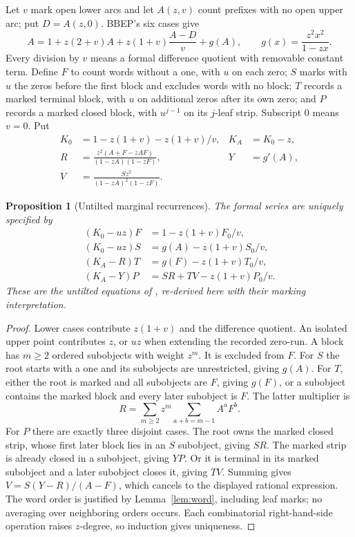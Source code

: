 \documentclass[11pt]{amsart}
\numberwithin{equation}{section}
\newtheorem{proposition}[theorem]{Proposition}
\theoremstyle{remark}\newtheorem{remark}[theorem]{Remark}
\begin{document}
Let $v$ mark open lower arcs and let $A(z,v)$ count prefixes with no open upper arc; put $D=A(z,0)$. BBEP's six cases give
\begin{equation}\label{eq:A}
 A=1+z(2+v)A+z(1+v)\frac{A-D}{v}+g(A),\qquad
 g(x)=\frac{z^2x^2}{1-zx}.
\end{equation}
Every division by $v$ means a formal difference quotient with removable constant term. Define $F$ to count words without a one, with $u$ on each zero; $S$ marks with $u$ the zeros before the first block and excludes words with no block; $T$ records a marked terminal block, with $u$ on additional zeros after its own zero; and $P$ records a marked closed block, with $u^{j-1}$ on its $j$-leaf strip. Subscript $0$ means $v=0$. Put
\begin{align*}
 K_0&=1-z(1+v)-z(1+v)/v,& K_A&=K_0-z,\\
 R&=\frac{z^2(A+F-zAF)}{(1-zA)(1-zF)},&Y&=g'(A),\\
 V&=\frac{Sz^2}{(1-zA)^2(1-zF)}.&&
\end{align*}
\begin{proposition}[Untilted marginal recurrences]\label{prop:M}
The formal series are uniquely specified by
\begin{align}\label{eq:M}
 (K_0-uz)F&=1-z(1+v)F_0/v,\nonumber\\
 (K_0-uz)S&=g(A)-z(1+v)S_0/v,\nonumber\\
 (K_A-R)T&=g(F)-z(1+v)T_0/v,\nonumber\\
 (K_A-Y)P&=SR+TV-z(1+v)P_0/v.
\end{align}
These are the untilted equations of \cite[Proposition 5.2, equations (18)--(21)]{N2}, re-derived here with their marking interpretation.
\end{proposition}
\begin{proof}
Lower cases contribute $z(1+v)$ and the difference quotient. An isolated upper point contributes $z$, or $uz$ when extending the recorded zero-run. A block has $m\geq2$ ordered subobjects with weight $z^m$. It is excluded from $F$. For $S$ the root starts with a one and its subobjects are unrestricted, giving $g(A)$. For $T$, either the root is marked and all subobjects are $F$, giving $g(F)$, or a subobject contains the marked block and every later subobject is $F$. The latter multiplier is
\[
 R=\sum_{m\geq2}z^m\sum_{a+b=m-1}A^aF^b.
\]
For $P$ there are exactly three disjoint cases. The root owns the marked closed strip, whose first later block lies in an $S$ subobject, giving $SR$. The marked strip is already closed in a subobject, giving $YP$. Or it is terminal in its marked subobject and a later subobject closes it, giving $TV$. Summing gives $V=S(Y-R)/(A-F)$, which cancels to the displayed rational expression. The word order is justified by Lemma~\ref{lem:word}, including leaf marks; no averaging over neighboring orders occurs. Each combinatorial right-hand-side operation raises $z$-degree, so induction gives uniqueness.
\end{proof}
\end{document}
